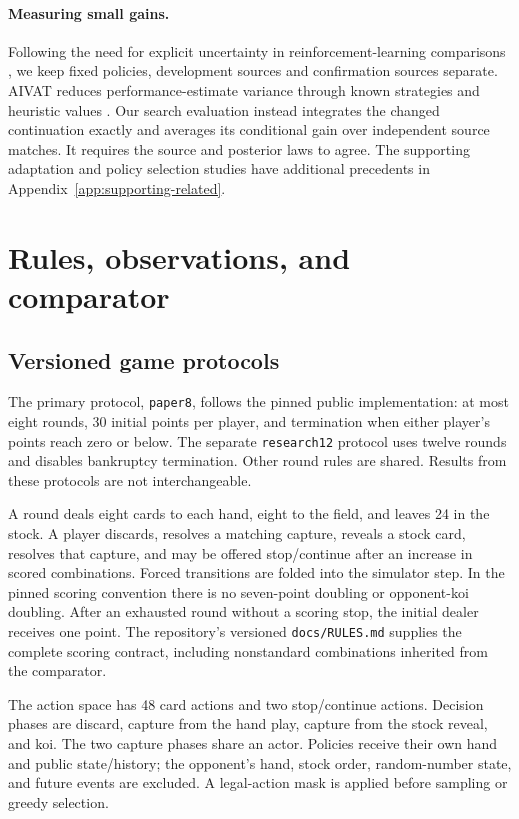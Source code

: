 \documentclass[11pt]{article}
\begin{document}
\paragraph{Measuring small gains.}
Following the need for explicit uncertainty in reinforcement-learning
comparisons \cite{agarwal2021precipice}, we keep fixed policies, development
sources and confirmation sources separate. AIVAT reduces performance-estimate
variance through known strategies and heuristic values \cite{burch2018aivat}.
Our search evaluation instead integrates the changed continuation exactly
and averages its conditional gain over independent source matches. It requires
the source and posterior laws to agree. The supporting adaptation and policy
selection studies have additional precedents in
Appendix~\ref{app:supporting-related}.

\section{Rules, observations, and comparator}
\subsection{Versioned game protocols}
The primary protocol, \texttt{paper8}, follows the pinned public implementation:
at most eight rounds, 30 initial points per player, and termination when either
player's points reach zero or below. The separate \texttt{research12} protocol
uses twelve rounds and disables bankruptcy termination. Other round rules
are shared. Results from these protocols are not interchangeable.

A round deals eight cards to each hand, eight to the field, and leaves 24 in
the stock. A player discards, resolves a matching capture, reveals a stock
card, resolves that capture, and may be offered stop/continue after an
increase in scored combinations. Forced transitions are folded into the
simulator step. In the pinned scoring convention there is no seven-point
doubling or opponent-koi doubling. After an exhausted round without a scoring
stop, the initial dealer receives one point. The repository's versioned
\texttt{docs/RULES.md} supplies the complete scoring contract, including
nonstandard combinations inherited from the comparator.

The action space has 48 card actions and two stop/continue actions. Decision
phases are discard, capture from the hand play, capture from the stock reveal,
and koi. The two capture phases share an actor. Policies receive their own
hand and public state/history; the opponent's hand, stock order, random-number
state, and future events are excluded. A legal-action mask is applied before
sampling or greedy selection.
\end{document}
